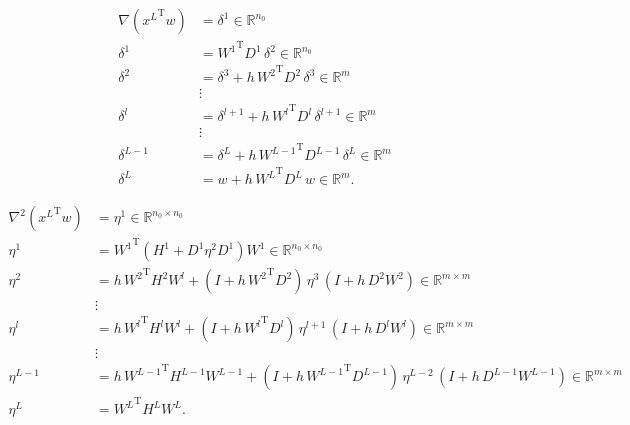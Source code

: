 \documentclass[9pt]{beamer}
\begin{document}
\begin{frame}
    \begin{equation*}
        \begin{aligned}
            \nabla \left( {x^{L}}^{\mathrm{T}} w \right) & = \delta^{1} \in \mathbb{R}^{n_0}  \\
            \delta^{1} & = {W^{1}}^{\mathrm{T}} D^{1} \, \delta^{2} \in \mathbb{R}^{n_0} \\
            \delta^{2} & = \delta^{3} + h \, {W^{2}}^{\mathrm{T}} D^{2} \, \delta^{3} \in \mathbb{R}^{m} \\
            &\vdots\\
            \delta^{l} & = \delta^{l+1} + h \, {W^{l}}^{\mathrm{T}} D^{l} \, \delta^{l+1} \in \mathbb{R}^{m} \\
            &\vdots\\
            \delta^{L-1} & = \delta^{L} + h \, {W^{L-1}}^{\mathrm{T}} D^{L-1} \, \delta^{L} \in \mathbb{R}^{m} \\
            \delta^{L} & = w + h \, {W^{L}}^{\mathrm{T}} D^{L} \, w \in \mathbb{R}^{m}.
        \end{aligned}   
    \end{equation*}
\end{frame}



\begin{frame}
    \begin{equation*}
        \begin{aligned}
            \nabla^2 \left( {x^{L}}^{\mathrm{T}} w \right) & = \eta^{1} \in \mathbb{R}^{n_0 \times n_0}  \\
            \eta^{1} & = {W^{1}}^{\mathrm{T}} \left( H^{1} + D^{1} \eta^{2} D^{1} \right) W^{1} \in \mathbb{R}^{n_0 \times n_0} \\
            \eta^{2} & = h \, {W^{2}}^{\mathrm{T}} H^2 W^{l} + \left( I + h \, {W^{2}}^{\mathrm{T}} D^{2} \right) \, \eta^{3} \, \left( I + h \,  D^{2} W^{2} \right) \in \mathbb{R}^{m \times m}\\ 
            &\vdots\\
            \eta^{l} & = h \, {W^{l}}^{\mathrm{T}} H^{l} W^{l} + \left( I + h \, {W^{l}}^{\mathrm{T}} D^{l} \right) \, \eta^{l+1} \, \left( I + h \,  D^{l} {W^{l}} \right) \in \mathbb{R}^{m \times m} \\ 
            &\vdots\\
            \eta^{L-1} & = h \, {W^{L-1}}^{\mathrm{T}} H^{L-1} W^{L-1} + \left( I + h \, {W^{L-1}}^{\mathrm{T}} D^{L-1} \right) \, \eta^{L-2} \, \left( I + h \,  D^{L-1} W^{L-1} \right) \in \mathbb{R}^{m \times m} \\ 
            \eta^{L} &  = {W^{L}}^{\mathrm{T}} H^{L} W^{L}.
        \end{aligned}
    \end{equation*}
\end{frame}
\end{document}
